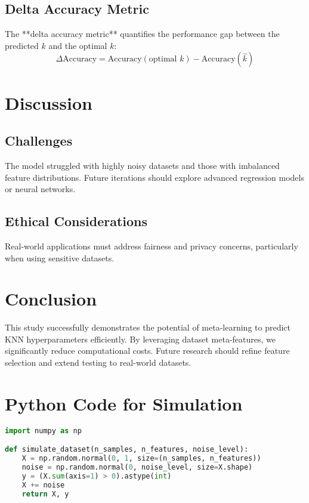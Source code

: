 \documentclass[a4paper,11pt]{article}
\begin{document}
\subsection{Delta Accuracy Metric}
The **delta accuracy metric** quantifies the performance gap between the predicted \(k\) and the optimal \(k\):
\[
\Delta \text{Accuracy} = \text{Accuracy}(\text{optimal } k) - \text{Accuracy}(\hat{k})
\]

\section{Discussion}
\subsection{Challenges}
The model struggled with highly noisy datasets and those with imbalanced feature distributions. Future iterations should explore advanced regression models or neural networks.

\subsection{Ethical Considerations}
Real-world applications must address fairness and privacy concerns, particularly when using sensitive datasets.

\section{Conclusion}
This study successfully demonstrates the potential of meta-learning to predict KNN hyperparameters efficiently. By leveraging dataset meta-features, we significantly reduce computational costs. Future research should refine feature selection and extend testing to real-world datasets.

\appendix
\section{Python Code for Simulation}
\begin{lstlisting}[language=Python, caption={Dataset Simulation Code}]
import numpy as np

def simulate_dataset(n_samples, n_features, noise_level):
    X = np.random.normal(0, 1, size=(n_samples, n_features))
    noise = np.random.normal(0, noise_level, size=X.shape)
    y = (X.sum(axis=1) > 0).astype(int)
    X += noise
    return X, y
\end{lstlisting}
\end{document}
